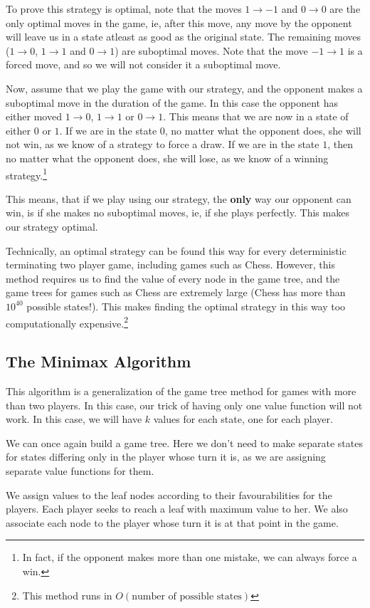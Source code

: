 \documentclass[12pt]{report}
\begin{document}
To prove this strategy is optimal, note that the moves $1 \rightarrow -1$ and $0 \rightarrow 0$ are the only optimal moves in the game, ie, after this
move, any move by the opponent will leave us in a state atleast as good as the original state. The remaining moves ($1 \rightarrow 0$, $1 \rightarrow 1$ and $0 \rightarrow 1$) are
suboptimal moves. Note that the move $-1 \rightarrow 1$ is a forced move, and so we will not consider it a suboptimal move.

Now, assume that we play the game with our strategy, and the opponent makes a suboptimal move in the duration of the game. In this case the opponent has either 
moved $1 \rightarrow 0$, $1 \rightarrow 1$ or $0 \rightarrow 1$. This means that we are now in a state of either $0$ or $1$. If we are in the state $0$, no matter what the opponent does, she will
not win, as we know of a strategy to force a draw. If we are in the state $1$, then no matter what the opponent does, she will lose, as we know of a winning strategy.\footnote{In fact, if the opponent makes more than one mistake, we can always force a win.}

This means, that if we play using our strategy, the \textbf{only} way our opponent can win, is if she makes no suboptimal moves, ie, if she plays perfectly. This makes our strategy optimal.

Technically, an optimal strategy can be found this way for every deterministic terminating two player game, including games such as Chess. However, this method requires us to find the value of every node in the game tree, and the game trees 
for games such as Chess are extremely large (Chess has more than $10^{40}$ possible states!). This makes finding the optimal strategy in this way too computationally expensive.\footnote{This method runs in $O(\text{number of possible states})$}
\subsection{The Minimax Algorithm}
This algorithm is a generalization of the game tree method for games with more than two players. In this case, our trick of having only one value function will not work.
In this case, we will have $k$ values for each state, one for each player.

We can once again build a game tree. Here we don't need to make separate states for states differing only in the player whose turn it is, as we are assigning separate value functions for them.

We assign values to the leaf nodes according to their favourabilities for the players. Each player seeks to reach a leaf with maximum value to her. We also associate each node to the player whose turn it is at that point in the game.
\end{document}
